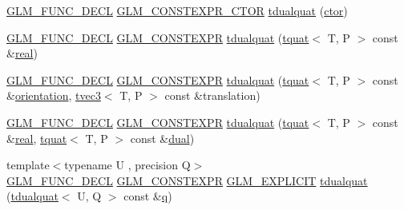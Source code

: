 \begin{DoxyCompactItemize}
\item 
\mbox{\hyperlink{setup_8hpp_ab2d052de21a70539923e9bcbf6e83a51}{G\+L\+M\+\_\+\+F\+U\+N\+C\+\_\+\+D\+E\+CL}} \mbox{\hyperlink{setup_8hpp_ad34178a09666081abdb573c14d1f4a5a}{G\+L\+M\+\_\+\+C\+O\+N\+S\+T\+E\+X\+P\+R\+\_\+\+C\+T\+OR}} \mbox{\hyperlink{structglm_1_1tdualquat_a841e898fdd7b59f32f9de1dde3f6179d}{tdualquat}} (\mbox{\hyperlink{namespaceglm_a807df837905ec286f806a536af03b57f}{ctor}})
\item 
\mbox{\hyperlink{setup_8hpp_ab2d052de21a70539923e9bcbf6e83a51}{G\+L\+M\+\_\+\+F\+U\+N\+C\+\_\+\+D\+E\+CL}} \mbox{\hyperlink{setup_8hpp_a08b807947b47031d3a511f03f89645ad}{G\+L\+M\+\_\+\+C\+O\+N\+S\+T\+E\+X\+PR}} \mbox{\hyperlink{structglm_1_1tdualquat_aa873fb312be8f6ca4fc1f90dabb543eb}{tdualquat}} (\mbox{\hyperlink{structglm_1_1tquat}{tquat}}$<$ T, P $>$ const \&\mbox{\hyperlink{structglm_1_1tdualquat_a402b3ac8410bd71a27f811dced8db14e}{real}})
\item 
\mbox{\hyperlink{setup_8hpp_ab2d052de21a70539923e9bcbf6e83a51}{G\+L\+M\+\_\+\+F\+U\+N\+C\+\_\+\+D\+E\+CL}} \mbox{\hyperlink{setup_8hpp_a08b807947b47031d3a511f03f89645ad}{G\+L\+M\+\_\+\+C\+O\+N\+S\+T\+E\+X\+PR}} \mbox{\hyperlink{structglm_1_1tdualquat_a602d2c96a4cecb0ac2e41a4fef10bff9}{tdualquat}} (\mbox{\hyperlink{structglm_1_1tquat}{tquat}}$<$ T, P $>$ const \&\mbox{\hyperlink{group__gtx__rotate__vector_ga49b4d082305cdfcfe0a5c184f684a902}{orientation}}, \mbox{\hyperlink{structglm_1_1tvec3}{tvec3}}$<$ T, P $>$ const \&translation)
\item 
\mbox{\hyperlink{setup_8hpp_ab2d052de21a70539923e9bcbf6e83a51}{G\+L\+M\+\_\+\+F\+U\+N\+C\+\_\+\+D\+E\+CL}} \mbox{\hyperlink{setup_8hpp_a08b807947b47031d3a511f03f89645ad}{G\+L\+M\+\_\+\+C\+O\+N\+S\+T\+E\+X\+PR}} \mbox{\hyperlink{structglm_1_1tdualquat_a26de194ec794353ab7b5c1e65994c95e}{tdualquat}} (\mbox{\hyperlink{structglm_1_1tquat}{tquat}}$<$ T, P $>$ const \&\mbox{\hyperlink{structglm_1_1tdualquat_a402b3ac8410bd71a27f811dced8db14e}{real}}, \mbox{\hyperlink{structglm_1_1tquat}{tquat}}$<$ T, P $>$ const \&\mbox{\hyperlink{structglm_1_1tdualquat_abeea1eb15f230d3bc50740c3811e1fd3}{dual}})
\item 
{\footnotesize template$<$typename U , precision Q$>$ }\\\mbox{\hyperlink{setup_8hpp_ab2d052de21a70539923e9bcbf6e83a51}{G\+L\+M\+\_\+\+F\+U\+N\+C\+\_\+\+D\+E\+CL}} \mbox{\hyperlink{setup_8hpp_a08b807947b47031d3a511f03f89645ad}{G\+L\+M\+\_\+\+C\+O\+N\+S\+T\+E\+X\+PR}} \mbox{\hyperlink{setup_8hpp_a6c74f5a5e7b134ab69023ff9a30d4d5d}{G\+L\+M\+\_\+\+E\+X\+P\+L\+I\+C\+IT}} \mbox{\hyperlink{structglm_1_1tdualquat_a9d75ca4f603fa51106665a5eb46606fe}{tdualquat}} (\mbox{\hyperlink{structglm_1_1tdualquat}{tdualquat}}$<$ U, Q $>$ const \&\mbox{\hyperlink{glad_8h_a514729309336df22bcc8eda979d6ced4}{q}})

\end{DoxyCompactItemize}
